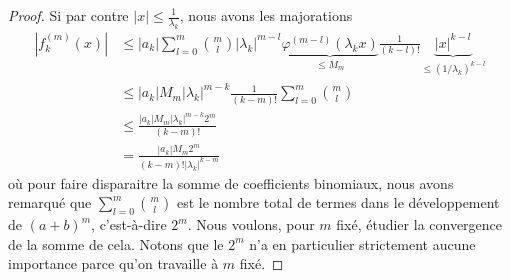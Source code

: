 \begin{proof}
	Si par contre \( | x |\leq\frac{1}{ \lambda_k }\), nous avons les majorations
	\begin{subequations}
		\begin{align}
			| f^{(m)}_k(x) | & \leq  |a_k|\sum_{l=0}^{m}\binom{ m }{ l }|\lambda_k|^{m-l}\underbrace{\varphi^{(m-l)}(\lambda_kx)}_{\leq M_m}\frac{ 1 }{ (k-l)! }\underbrace{| x |^{k-l}}_{\leq (1/\lambda_k)^{k-l}} \\
			                 & \leq | a_k |M_m| \lambda_k |^{m-k}\frac{1}{ (k-m)! }\sum_{l=0}^{m}\binom{ m }{ l }                                                                                                   \\
			                 & \leq \frac{ | a_k |M_m | \lambda_k |^{m-k}2^m }{ (k-m)! }                                                                                                                            \\
			                 & = \frac{ | a_k |M_m 2^m }{ (k-m)!  | \lambda_k |^{k-m} }       \label{EqQSPUaun}
		\end{align}
	\end{subequations}
	où pour faire disparaitre la somme de coefficients binomiaux, nous avons remarqué que \( \sum_{l=0}^m\binom{ m }{ l }\) est le nombre total de termes dans le développement de \( (a+b)^m\), c'est-à-dire \( 2^m\). Nous voulons, pour \( m\) fixé, étudier la convergence de la somme de cela. Notons que le \( 2^m\) n'a en particulier strictement aucune importance parce qu'on travaille à \( m\) fixé.


\end{proof}
